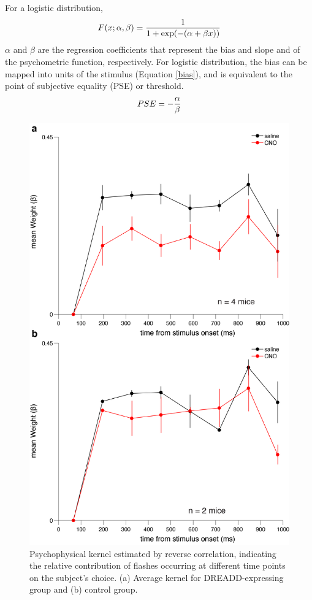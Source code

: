 For a logistic distribution,
\begin{equation}
	\centering
	F(x;\alpha,\beta) = \frac{1}{1 + \exp(-(\alpha + \beta x))}
\end{equation}
$\alpha$ and $\beta$ are the regression coefficients that represent the bias and slope and of the psychometric function, respectively. For logistic distribution, the bias can be mapped into units of the stimulus (Equation \ref{bias}), and is equivalent to the point of subjective equality (PSE) or threshold.  
\begin{equation}
	\centering
	PSE =  -\frac{\alpha}{\beta}
    \label{bias}
\end{equation}
\begin{figure}
  \centering
  	\includegraphics[scale=0.3]{Figures/chapter3/psychophysical_kernel_sem_dreaddandcontrol.png}
  \caption[Reverse Correlation Psychophysical Kernel]{Psychophysical kernel estimated by reverse correlation, indicating the relative contribution of flashes occurring at different time points on the subject's choice. (a) Average kernel for DREADD-expressing group and (b) control group.}
   \label{fig:dreaddkernel}
\end{figure}
